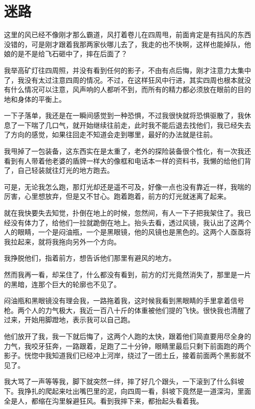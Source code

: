 \chapter{迷路}

这里的风已经不像刚才那么霸道，风打着卷儿在四周甩，前面肯定是有挡风的东西没错的，可是刚才跟着我那两家伙哪儿去了，我走的也不快啊，这样也能掉队，他娘的是不是给飞石砸中了，摔在后面了？

我举高矿灯往四周照，并没有看到任何的影子，不由有点后悔，刚才注意力太集中了，我没有太过注意四周的情况。不过，在这样狂风中行进，其实四周也根本就没有什么情况可以注意，风声响的人都听不到，而所有的精力都必须放在眼前的目的地和身体的平衡上。

一下子落单，我还是在一瞬间感觉到一种恐惧，不过我很快就将恐惧驱散了，我休息了一下喘了几口气，就开始继续往前走，此时我不能后退去找他们，我已经失去了方向的感觉，如果往回走不知道会走到哪里，最好的办法就是往前。

我甩掉了一包装备，这东西实在是太重了，老外的探险装备很个性化，有一次我还看到有人带着他老婆的盾牌一样大的像框和电话本一样的资料书，我懒的给他们背了，自己轻装就往灯光的地方跑去。

可是，无论我怎么跑，那灯光却还是遥不可及，好像一点也没有靠近一样，我喘的厉害，心里想放弃，但是又不甘心。跑着跑着，前方的灯光就迷离了起来。

就在我快要失去知觉，扑倒在地上的时候，忽然间，有人一下子把我架住了。我已经没有体力了，给他们一拉就跪倒在地上。抬头去看，透过风镜，我认出了这两个人的眼睛，一个是闷油瓶，一个是黑眼镜，他的风镜也是黑色的。这两个人亟亟将我拉起来，就将我拖向另外一个方向。

我挣脱他们，指着前方，想告诉他们那里有避风的地方。

然而我再一看，却呆住了，什么都没有看到，前方的灯光竟然消失了，那里是一片的黑暗，连那个巨大的轮廓也不见了。

闷油瓶和黑眼镜没有理会我，一路拖着我，这时候我看到黑眼睛的手里拿着信号枪。两个人的力气极大，我近一百八十斤的体重被他们提的飞快。很快我也清醒了过来，开始用脚蹬地，表示我可以自己跑。

他们放开了我，我一下就后悔了，这两个人跑的太快，跟着他们简直要用尽全身的力气，我咬牙狂奔，一路跟着，足跑了二十分钟，眼睛里最后只剩下前面跑的两个影子。恍惚中我知道我们已经冲上河岸，绕过了一团土丘，接着前面两个黑影就不见了。

我大骂了一声等等我，脚下就突然一绊，摔了好几个跟头，一下滚到了什么斜坡下。我挣扎的爬起来吐出嘴巴里的泥，向四周一看，斜坡下竟然是一道深沟，里面全是人，都缩在沟里躲避狂风。看到我摔下来，都抬起头看着我。

